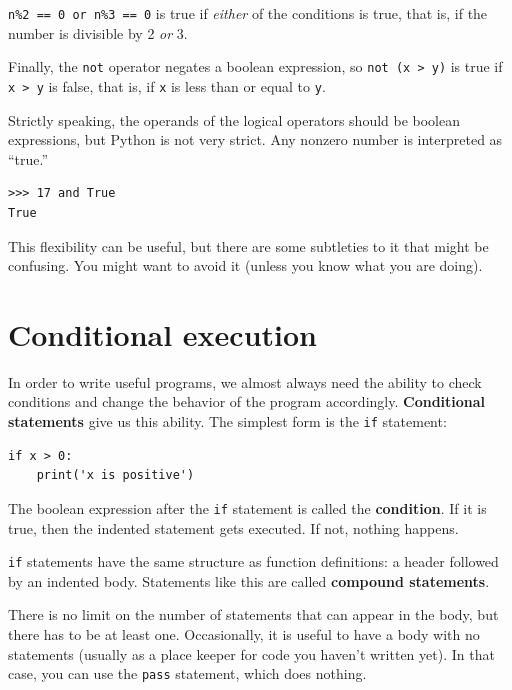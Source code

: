 \documentclass[10pt]{book}
\begin{document}

{\tt n\%2 == 0 or n\%3 == 0} is true if {\em either} of the conditions
is true, that is, if the number is divisible by 2 {\em or} 3.

Finally, the {\tt not} operator negates a boolean
expression, so {\tt not (x > y)} is true if {\tt x > y} is false,
that is, if {\tt x} is less than or equal to {\tt y}.

Strictly speaking, the operands of the logical operators should be
boolean expressions, but Python is not very strict.
Any nonzero number is interpreted as ``true.''

\beforeverb
\begin{verbatim}
>>> 17 and True
True
\end{verbatim}
\afterverb
%
This flexibility can be useful, but there are some subtleties to
it that might be confusing.  You might want to avoid it (unless
you know what you are doing).


\section{Conditional execution}
\label{conditional execution}


In order to write useful programs, we almost always need the ability
to check conditions and change the behavior of the program
accordingly.  {\bf Conditional statements} give us this ability.  The
simplest form is the {\tt if} statement:

\beforeverb
\begin{verbatim}
if x > 0:
    print('x is positive')
\end{verbatim}
\afterverb
%
The boolean expression after the {\tt if} statement is
called the {\bf condition}.  If it is true, then the indented
statement gets executed.  If not, nothing happens.


{\tt if} statements have the same structure as function definitions:
a header followed by an indented body.  Statements like this are
called {\bf compound statements}.

There is no limit on the number of statements that can appear in
the body, but there has to be at least one.
Occasionally, it is useful to have a body with no statements (usually
as a place keeper for code you haven't written yet).  In that
case, you can use the {\tt pass} statement, which does nothing.
\end{document}
